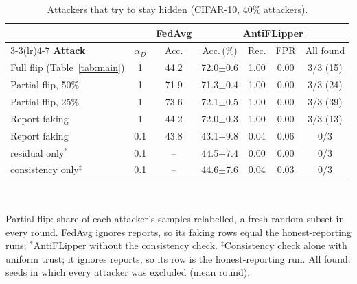 \begin{table}[t]
\centering
\caption{Attackers that try to stay hidden (CIFAR-10, 40\% attackers).}
\label{tab:adaptive}
\footnotesize
\setlength{\tabcolsep}{3.2pt}
\begin{tabular}{@{}l c c cccc@{}}
\toprule
& & \textbf{FedAvg} & \multicolumn{4}{c}{\textbf{AntiFLipper}} \\
\cmidrule(lr){3-3}\cmidrule(lr){4-7}
\textbf{Attack} & $\alpha_D$ & Acc. & Acc.\,(\%) & Rec. & FPR & All found \\
\midrule
Full flip (Table~\ref{tab:main}) & 1 & 44.2 & 72.0{\scriptsize$\pm$0.6} & 1.00 & 0.00 & 3/3 (15) \\
\midrule
Partial flip, 50\% & 1 & 71.9 & 71.3{\scriptsize$\pm$0.4} & 1.00 & 0.00 & 3/3 (24) \\
Partial flip, 25\% & 1 & 73.6 & 72.1{\scriptsize$\pm$0.5} & 1.00 & 0.00 & 3/3 (39) \\
\midrule
Report faking & 1 & 44.2 & 72.0{\scriptsize$\pm$0.3} & 1.00 & 0.00 & 3/3 (13) \\
Report faking & 0.1 & 43.8 & 43.1{\scriptsize$\pm$9.8} & 0.04 & 0.06 & 0/3 \\
\quad residual only$^{*}$ & 0.1 & -- & 44.5{\scriptsize$\pm$7.4} & 0.00 & 0.00 & 0/3 \\
\quad consistency only$^{\ddagger}$ & 0.1 & -- & 44.6{\scriptsize$\pm$7.6} & 0.04 & 0.03 & 0/3 \\
\bottomrule
\end{tabular}
\\[2pt]\parbox{\linewidth}{\scriptsize Partial flip: share of each attacker's samples relabelled, a fresh random subset in every round. FedAvg ignores reports, so its faking rows equal the honest-reporting runs; $^{*}$AntiFLipper without the consistency check. $^{\ddagger}$Consistency check alone with uniform trust; it ignores reports, so its row is the honest-reporting run. All found: seeds in which every attacker was excluded (mean round).}
\end{table}
